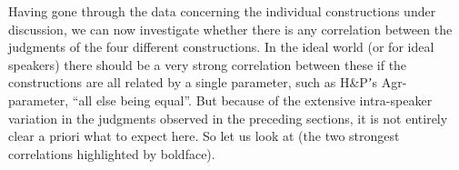 \documentclass[output=paper]{LSP/langsci}
\begin{document}
Having gone through the data concerning the individual constructions under discussion, we can now investigate whether there is any correlation between the judgments of the four different constructions. In the ideal world (or for ideal speakers) there should be a very strong correlation between these if the constructions are all related by a single parameter, such as H{\&}Pʼs Agr-parameter, “all else being equal”. But because of the extensive intra-speaker variation in the judgments observed in the preceding sections, it is not entirely clear a priori what to expect here. So let us look at  (the two strongest correlations highlighted by boldface).

\begin{table}
\caption{Correlation between the evaluations of the four constructions under investigation.}
\label{tab:Thrainsson:6}
\end{table}
\end{document}
